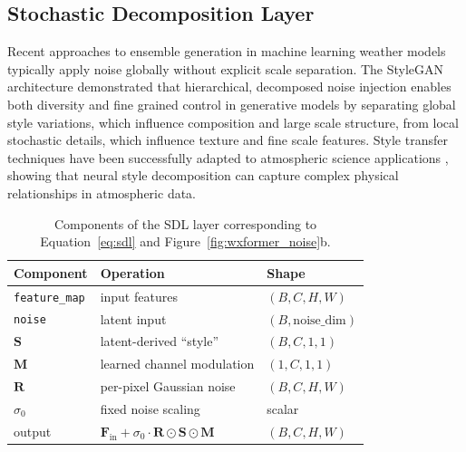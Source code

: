 \documentclass{agujournal2019}
\begin{document}
\subsection{Stochastic Decomposition Layer}
Recent approaches to ensemble generation in machine learning weather models typically apply noise globally without explicit scale separation. The StyleGAN architecture \cite{karras2019style, karras2020analyzing} demonstrated that hierarchical, decomposed noise injection enables both diversity and fine grained control in generative models by separating global style variations, which influence composition and large scale structure, from local stochastic details, which influence texture and fine scale features. Style transfer techniques have been successfully adapted to atmospheric science applications \cite{schreck2023style}, showing that neural style decomposition can capture complex physical relationships in atmospheric data.


\begin{table}[t!]
\centering
\begin{tabular}{l l l}
\toprule
\textbf{Component} & \textbf{Operation} & \textbf{Shape} \\
\midrule
\texttt{feature\_map} & input features & $(B, C, H, W)$ \\
\texttt{noise} & latent input & $(B, \text{noise\_dim})$ \\
$\mathbf{S}$ & latent-derived ``style'' & $(B, C, 1, 1)$ \\
$\mathbf{M}$ & learned channel modulation & $(1, C, 1, 1)$ \\
$\mathbf{R}$ & per-pixel Gaussian noise & $(B, C, H, W)$ \\
$\sigma_0$ & fixed noise scaling & scalar \\
output & $\mathbf{F}_{\text{in}} + \sigma_0 \cdot \mathbf{R} \odot \mathbf{S} \odot \mathbf{M}$ & $(B, C, H, W)$ \\
\bottomrule
\end{tabular}
\caption{Components of the SDL layer corresponding to Equation~\ref{eq:sdl} and Figure~\ref{fig:wxformer_noise}b.}
\label{tab:tensor_shapes}
\end{table}
\end{document}
